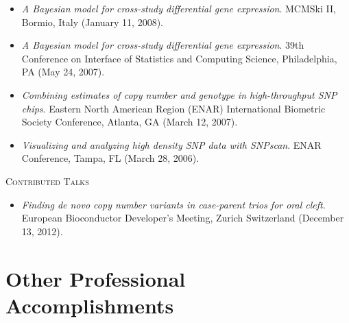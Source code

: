 \documentclass[11pt]{article}%
\begin{document}
{\begin{itemize}
\item {\it A Bayesian model for cross-study differential gene
    expression}. MCMSki II, Bormio, Italy (January 11, 2008).

\item {\it A Bayesian model for cross-study differential gene
    expression}. 39th Conference on Interface of Statistics and
  Computing Science, Philadelphia, PA (May 24, 2007).

\item {\it Combining estimates of copy number and genotype in
    high-throughput SNP chips}. Eastern North American Region (ENAR)
  International Biometric Society Conference, Atlanta, GA (March 12, 2007).

\item {\it Visualizing and analyzing high density SNP data with
    SNPscan}. ENAR Conference, Tampa, FL (March 28, 2006).
\end{itemize}

\vspace{2pt}

\noindent\textsc{Contributed Talks}

\begin{itemize}

\item {\it Finding de novo copy number variants in case-parent trios
    for oral cleft}. European Bioconductor Developer's Meeting, Zurich
  Switzerland (December 13, 2012).

\end{itemize}

\vspace{2pt}

\section*{\sc Other Professional Accomplishments}

}
\end{document}
